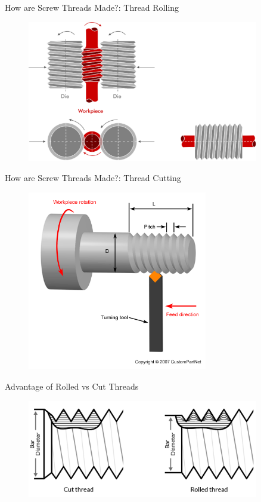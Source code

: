 \documentclass[10pt, svgnames]{beamer}
\begin{document}
\begin{frame}[label={sec:orgd6510ad}]{How are Screw Threads Made?: Thread Rolling}
\begin{figure}[h]
  \centering
  \includegraphics[width=0.9\textwidth]{pictures/thread-rolling}
\end{figure}
\end{frame}

\begin{frame}[label={sec:org0ea12ec}]{How are Screw Threads Made?: Thread Cutting}
\begin{figure}[h]
  \centering
  \includegraphics[width=0.7\textwidth]{pictures/thread-cutting}
\end{figure}
\end{frame}

\begin{frame}[label={sec:org57b5fdf}]{Advantage of Rolled vs Cut Threads}
\begin{figure}[h]
  \centering
  \includegraphics[width=0.9\textwidth]{pictures/cut-rolled-thread}
\end{figure}
\end{frame}
\end{document}
